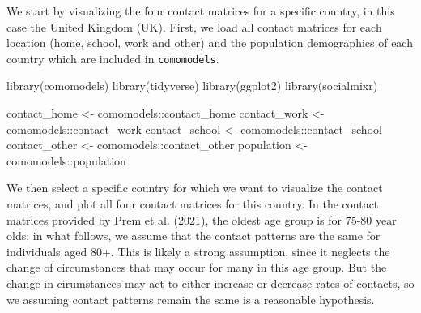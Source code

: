 \documentclass[
]{article}
\newenvironment{Shaded}{\begin{snugshade}}{\end{snugshade}}
\newcommand{\FunctionTok}[1]{\textcolor[rgb]{0.00,0.00,0.00}{#1}}
\newcommand{\NormalTok}[1]{#1}
\newcommand{\OtherTok}[1]{\textcolor[rgb]{0.56,0.35,0.01}{#1}}
\newcommand{\SpecialCharTok}[1]{\textcolor[rgb]{0.00,0.00,0.00}{#1}}
\begin{document}
We start by visualizing the four contact matrices for a specific
country, in this case the United Kingdom (UK). First, we load all
contact matrices for each location (home, school, work and other) and
the population demographics of each country which are included in
\texttt{comomodels}.

\begin{Shaded}
\begin{Highlighting}[]
\FunctionTok{library}\NormalTok{(comomodels)}
\FunctionTok{library}\NormalTok{(tidyverse)}
\FunctionTok{library}\NormalTok{(ggplot2)}
\FunctionTok{library}\NormalTok{(socialmixr)}

\NormalTok{contact\_home }\OtherTok{\textless{}{-}}\NormalTok{ comomodels}\SpecialCharTok{::}\NormalTok{contact\_home}
\NormalTok{contact\_work }\OtherTok{\textless{}{-}}\NormalTok{ comomodels}\SpecialCharTok{::}\NormalTok{contact\_work}
\NormalTok{contact\_school }\OtherTok{\textless{}{-}}\NormalTok{ comomodels}\SpecialCharTok{::}\NormalTok{contact\_school}
\NormalTok{contact\_other }\OtherTok{\textless{}{-}}\NormalTok{ comomodels}\SpecialCharTok{::}\NormalTok{contact\_other}
\NormalTok{population }\OtherTok{\textless{}{-}}\NormalTok{ comomodels}\SpecialCharTok{::}\NormalTok{population}
\end{Highlighting}
\end{Shaded}

We then select a specific country for which we want to visualize the
contact matrices, and plot all four contact matrices for this country.
In the contact matrices provided by Prem et al. (2021), the oldest age
group is for 75-80 year olds; in what follows, we assume that the
contact patterns are the same for individuals aged 80+. This is likely a
strong assumption, since it neglects the change of circumstances that
may occur for many in this age group. But the change in cirumstances may
act to either increase or decrease rates of contacts, so we assuming
contact patterns remain the same is a reasonable hypothesis.
\end{document}
